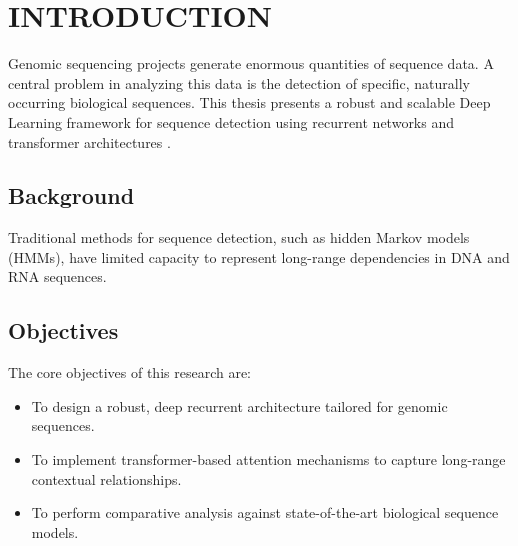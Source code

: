 \chapter{INTRODUCTION}
\label{ch:introduction}

Genomic sequencing projects generate enormous quantities of sequence data. A central problem in analyzing this data is the detection of specific, naturally occurring biological sequences. This thesis presents a robust and scalable Deep Learning framework for sequence detection using recurrent networks and transformer architectures \cite{attention2017}.

\section{Background}
Traditional methods for sequence detection, such as hidden Markov models (HMMs), have limited capacity to represent long-range dependencies in DNA and RNA sequences. 

\section{Objectives}
The core objectives of this research are:
\begin{itemize}
    \item To design a robust, deep recurrent architecture tailored for genomic sequences.
    \item To implement transformer-based attention mechanisms to capture long-range contextual relationships.
    \item To perform comparative analysis against state-of-the-art biological sequence models.
\end{itemize}
